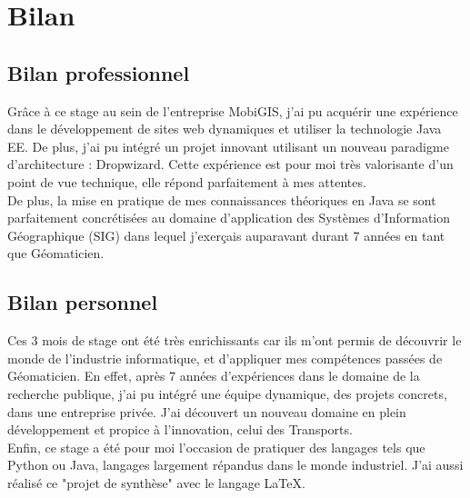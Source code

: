 \chapter{Bilan}
\label{Bilan}


\section{Bilan professionnel}

Grâce à ce stage au sein de l’entreprise MobiGIS, j’ai pu acquérir une expérience dans le développement de sites web dynamiques et utiliser la technologie Java EE. De plus, j'ai pu intégré un projet innovant utilisant un nouveau paradigme d'architecture : Dropwizard. Cette expérience est pour moi très valorisante d'un point de vue technique, elle répond parfaitement à mes attentes.\\

De plus, la mise en pratique de mes connaissances théoriques en Java se sont parfaitement concrétisées au domaine d'application des Systèmes d'Information Géographique (SIG) dans lequel j'exerçais auparavant durant 7 années en tant que Géomaticien. \\

\section{Bilan personnel}

Ces 3 mois de stage ont été très enrichissants car ils m'ont permis de découvrir le monde de l'industrie informatique, et d'appliquer mes compétences passées de Géomaticien. En effet, après 7 années d'expériences dans le domaine de la recherche publique, j'ai pu intégré une équipe dynamique, des projets concrets, dans une entreprise privée. J'ai découvert un nouveau domaine en plein développement et propice à l'innovation, celui des Transports. \\

Enfin, ce stage a été pour moi l'occasion de pratiquer des langages tels que Python ou Java, langages largement répandus dans le monde industriel. J'ai aussi réalisé ce "projet de synthèse" avec le langage  \LaTeX{}.\\